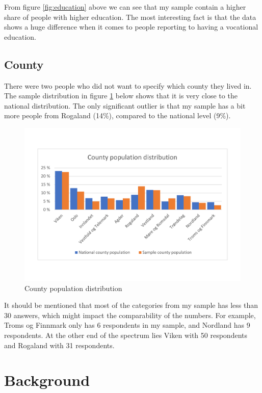 From figure \ref{fig:education} above we can see that my sample contain a higher share of people with higher education. The most interesting fact is that the data shows a huge difference when it comes to people reporting to having a vocational education. 

\subsection{County}
There were two people who did not want to specify which county they lived in. The sample distribution in figure \ref{fig:county} below shows that it is very close to the national distribution. The only significant outlier is that my sample has a bit more people from Rogaland (14\%), compared to the national level (9\%).

\begin{figure}[H]
    \centering
    \includegraphics[scale=0.45]{figures/diagrams/county_ssb.pdf}
    \caption{County population distribution}
    \label{fig:county}
\end{figure}

It should be mentioned that most of the categories from my sample has less than 30 answers, which might impact the comparability of the numbers. For example, Troms og Finnmark only has 6 respondents in my sample, and Nordland has 9 respondents. At the other end of the spectrum lies Viken with 50 respondents and Rogaland with 31 respondents. 

\section{Background}

